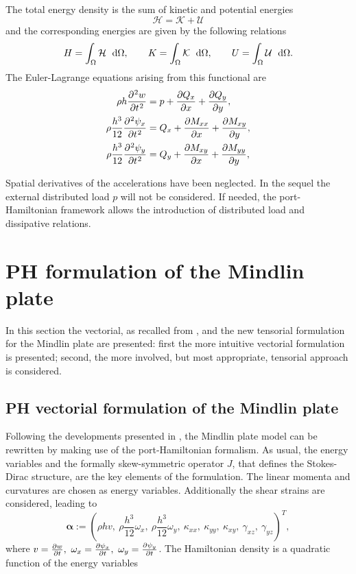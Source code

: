 \documentclass[preprint,12pt]{elsarticle}
\begin{document}
The total energy density is the sum of kinetic and potential energies
\begin{equation}
\mathcal{H} = \mathcal{K} + \mathcal{U}
\end{equation}
and the corresponding energies are given by the following relations
\begin{equation}
H = \int_{\Omega} \mathcal{H} \ \d\Omega, \qquad K = \int_{\Omega} \mathcal{K} \ \d\Omega, \qquad U = \int_{\Omega} \mathcal{U} \ \d\Omega.
\end{equation}
The Euler-Lagrange equations arising from this functional are
\begin{equation}
\begin{aligned}
\rho h \diffp[2]{w}{t} &=  p + \diffp{Q_x}{x} + \diffp{Q_y}{y}, \\
\rho\frac{h^3}{12} \diffp[2]{\psi_x}{t} &= Q_x + \diffp{M_{xx}}{x} + \diffp{M_{xy}}{y}, \\
\rho\frac{h^3}{12} \diffp[2]{\psi_y}{t} &= Q_y + \diffp{M_{xy}}{x} + \diffp{M_{yy}}{y}, \\
\end{aligned}
\end{equation}

Spatial derivatives of the accelerations have been neglected. In the sequel the external distributed load $p$ will not be considered. If needed, the port-Hamiltonian framework allows the introduction of distributed load and dissipative relations.

\section{PH formulation of the Mindlin plate}
In this section the vectorial, as recalled from \cite{MacchelliMindlin},  and the new tensorial formulation for the Mindlin plate are presented: first the more intuitive vectorial formulation is presented; second, the more involved, but most appropriate, tensorial approach is considered. 


\subsection{PH vectorial formulation of the Mindlin plate}
\label{sec:PH_vec_Min}
Following the developments presented in \cite{MacchelliMindlin}, the Mindlin plate model can be rewritten by making use of the port-Hamiltonian formalism. As usual, the energy variables and the formally skew-symmetric operator $J$, that defines the Stokes-Dirac structure, are the key elements of the formulation. The linear momenta and curvatures are chosen as energy variables. Additionally the shear strains are considered, leading to \begin{equation}
\bm{\alpha} := \left(\rho h v,\ \rho \frac{h^3}{12} \omega_x,\ \rho \frac{h^3}{12} \omega_y,\ \kappa_{xx},\ \kappa_{yy},\ \kappa_{xy},\ \gamma_{xz},\ \gamma_{yz} \right)^T,
\end{equation}
where $v = \diffp{w}{t},\ \omega_x = \diffp{\psi_x}{t},\ \omega_y = \diffp{\psi_y}{t}$. The Hamiltonian density is a quadratic function of the energy variables 
\end{document}
